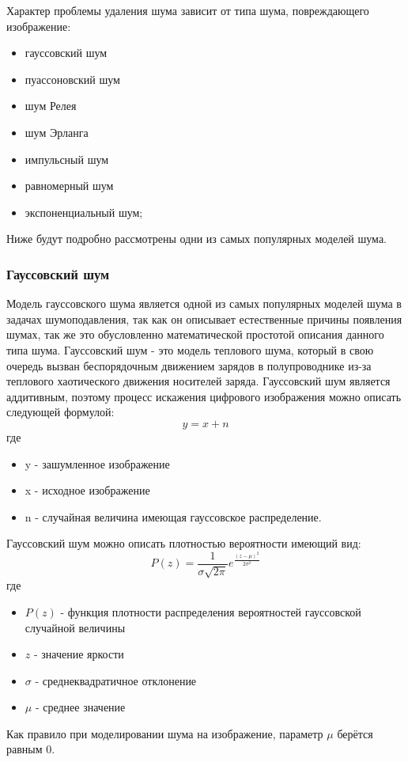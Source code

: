 Характер проблемы удаления шума зависит от типа шума, повреждающего изображение\cite{Gonzalez}: 
\begin{itemize}
	\item гауссовский шум
	\item пуассоновский шум
	\item шум Релея
	\item шум Эрланга
	\item импульсный шум
	\item равномерный шум
	\item экспоненциальный шум;
\end{itemize}

Ниже будут подробно рассмотрены одни из самых популярных моделей шума.
\subsubsection{Гауссовский  шум}
Модель гауссовского шума является одной из самых популярных моделей шума в задачах шумоподавления, так как он описывает естественные причины появления шумах, так же это обусловленно математической простотой описания данного типа шума.
Гауссовский шум - это модель теплового шума, который в свою очередь вызван беспорядочным движением зарядов в полупроводнике из-за теплового хаотического движения носителей заряда\cite{Polupro}.
Гауссовский шум является аддитивным, поэтому процесс искажения цифрового изображения можно описать следующей формулой:
\begin{equation}
	y = x + n
\end{equation}
где
\begin{itemize}
	\item y - зашумленное изображение 
	\item x - исходное изображение
	\item n - случайная величина имеющая гауссовское распределение.
\end{itemize}
Гауссовский шум можно описать плотностью вероятности имеющий вид\cite{gauss}:
\begin{equation}
	P(z)=\frac{1}{\sigma\sqrt{2\pi}}e^{\frac{(z-\mu)^2}{2\sigma^2}}
\end{equation}
где
\begin{itemize}
	\item $P(z)$ - функция плотности распределения вероятностей гауссовской случайной величины
	\item $z$ - значение яркости
	\item $\sigma$ - среднеквадратичное отклонение
	\item $\mu$ - среднее значение
\end{itemize}
Как правило при моделировании шума на изображение, параметр $\mu$ берётся равным 0.

